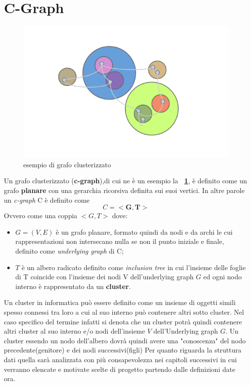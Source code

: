 {\section{C-Graph}
\begin{figure}[!htb]
	\begin{center}
		\includegraphics[width=0.9 \linewidth]{figure/cgraphGenerico}
	\end{center}
	\caption{esempio di grafo clusterizzato \label{fig:cgraphGenerico}}
\end{figure}
Un grafo clusterizzato (\textbf{c-graph}),di cui ne è un esempio la \textbf{\figurename~\ref{fig:cgraphGenerico}}, è definito come un grafo \textbf{planare} con una gerarchia ricorsiva definita sui suoi vertici. In altre parole un \textit{c-graph} C è definito come $$C=<\textbf{G},\textbf{T}>$$ 
Ovvero come una coppia $<G,T>$ dove:
\begin{itemize}
	\item\textbf{$G=(V,E)$} è un grafo planare, formato quindi da nodi e da archi le cui rappresentazioni non intersecano nulla se non il punto iniziale e finale, definito come \textit{underlying graph} di C;
	\item\textbf{$T$} è un albero radicato definito come \textit{inclusion tree} in cui l'insieme delle foglie di T coincide con l'insieme dei nodi V dell'underlying graph $G$ ed ogni nodo interno è rappresentato da un \textbf{cluster}.
\end{itemize}
Un cluster in informatica può essere definito come un insieme di oggetti simili spesso connessi tra loro a cui al suo interno può contenere altri sotto cluster.
Nel caso specifico del termine infatti si denota che un cluster potrà quindi contenere altri cluster al suo interno e/o nodi dell'insieme $V$ dell'Underlying graph $G$.
Un cluster essendo un nodo dell'albero dovrà quindi avere una "conoscenza" del nodo precedente(genitore) e dei nodi successivi(figli) 
Per quanto riguarda la struttura dati quella sarà analizzata con più consapevolezza nei capitoli successivi in cui verranno elencate e motivate scelte di progetto partendo dalle definizioni date ora.
}
